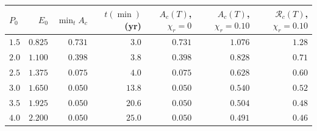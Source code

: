 \begin{tabular}{l r r r r r r}
\toprule
$P_0$ & $E_0$ & $\min_tA_c$ & $t(\min)$ (yr) & $A_c(T)$, $\chi_r=0$ & $A_c(T)$, $\chi_r=0.10$ & $\mathcal R_c(T)$, $\chi_r=0.10$ \\
\midrule
$1.5$ & $0.825$ & $0.731$ & $3.0$ & $0.731$ & $1.076$ & $1.28$ \\
$2.0$ & $1.100$ & $0.398$ & $3.8$ & $0.398$ & $0.828$ & $0.71$ \\
$2.5$ & $1.375$ & $0.075$ & $4.0$ & $0.075$ & $0.628$ & $0.60$ \\
$3.0$ & $1.650$ & $0.050$ & $13.8$ & $0.050$ & $0.540$ & $0.52$ \\
$3.5$ & $1.925$ & $0.050$ & $20.6$ & $0.050$ & $0.504$ & $0.48$ \\
$4.0$ & $2.200$ & $0.050$ & $25.0$ & $0.050$ & $0.491$ & $0.46$ \\
\bottomrule
\end{tabular}